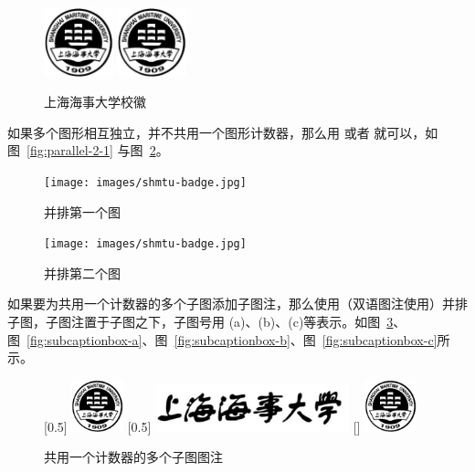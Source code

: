 \begin{figure}[!htp]
  \centering
  \includegraphics[height=2cm]{images/shmtu-badge}
  \hspace{1cm}
  \includegraphics[height=2cm]{images/shmtu-badge}
  \caption{上海海事大学校徽}
  \label{fig:parallel-1}
\end{figure}

如果多个图形相互独立，并不共用一个图形计数器，那么用  或者 就可以，如图~\ref{fig:parallel-2-1} 与图~\ref{fig:parallel-2-2}。

\begin{figure}[!htp]
  \begin{minipage}{0.48\textwidth}
  	\centering
    \texttt{[image: images/shmtu-badge.jpg]}
    \caption{并排第一个图}
    \label{fig:parallel-2-1}
  \end{minipage}
  \hfill
  \begin{minipage}{0.48\textwidth}
    \centering
    \texttt{[image: images/shmtu-badge.jpg]}
    \caption{并排第二个图}
    \label{fig:parallel-2-2}
  \end{minipage}
\end{figure}

如果要为共用一个计数器的多个子图添加子图注，那么使用（双语图注使用）并排子图，子图注置于子图之下，子图号用 (a)、(b)、(c)等表示。如图~\ref{fig:subcaptionbox}、图~\ref{fig:subcaptionbox-a}、图~\ref{fig:subcaptionbox-b}、图~\ref{fig:subcaptionbox-c}所示。

\begin{figure}[!htp]
	[0.5\textwidth]{%
	  \includegraphics[height=1.5cm]{images/shmtu-badge}
	}
  \hfill
    [0.5\textwidth]{%
	  \includegraphics[width=0.5\textwidth]{images/shmtu-name}
	}
  \hfill
    [\textwidth]{%
	  \includegraphics[height=1.5cm]{images/shmtu-badge}
  }
  \caption{共用一个计数器的多个子图图注}
  \label{fig:subcaptionbox}
\end{figure}

